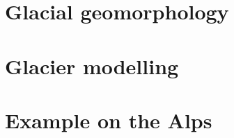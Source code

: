 

\section{Glacial geomorphology}



\section{Glacier modelling}



\section{Example on the Alps}




